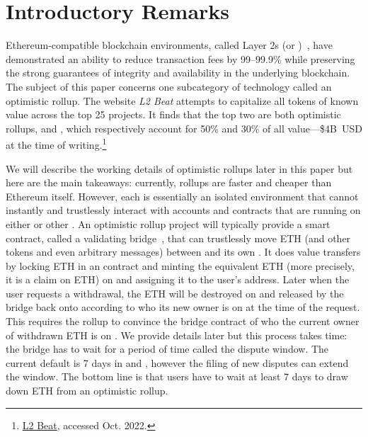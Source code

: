 \section{Introductory Remarks}

Ethereum-compatible blockchain environments, called Layer 2s (or \layertwos)~\cite{gudgeon2019sok}, have demonstrated an ability to reduce transaction fees by 99--99.9\% while preserving the strong guarantees of integrity and availability in the underlying blockchain. The subject of this paper concerns one subcategory of \layertwo technology called an optimistic rollup. The website \textit{L2 Beat} attempts to capitalize all tokens of known value across the top 25 \layertwo projects. It finds that the top two \layertwos are both optimistic rollups, \arb and \opt, which respectively account for 50\% and 30\% of all \layertwo value---\$4B~USD at the time of writing.\footnote{\href{https://l2beat.com/scaling/tvl/}{L2 Beat}, accessed Oct. 2022.}

We will describe the working details of optimistic rollups later in this paper but here are the main takeaways: currently, rollups are faster and cheaper than Ethereum itself. However, each \layertwo is essentially an isolated environment that cannot instantly and trustlessly interact with accounts and contracts that are running on either \layerone or other \layertwos. An optimistic rollup project will typically provide a smart contract, called a validating bridge~\cite{mccorry2021sok}, that can trustlessly move ETH (and other tokens and even arbitrary messages) between \layerone and its own \layertwo. It does value transfers by locking ETH in an \layerone contract and minting the equivalent ETH (more precisely, it is a \layertwo claim on \layerone ETH) on \layertwo and assigning it to the user's \layertwo address. Later when the user requests a withdrawal, the ETH will be destroyed on \layertwo and released by the bridge back onto \layerone according to who its new owner is on \layertwo at the time of the request. This requires the rollup to convince the \layerone bridge contract of who the current owner of withdrawn ETH is on \layertwo. We provide details later but this process takes time: the bridge has to wait for a period of time called the dispute window. The current default is 7 days in \arb and \opt, however the filing of new disputes can extend the window. The bottom line is that users have to wait at least 7 days to draw down ETH from an optimistic rollup. 

